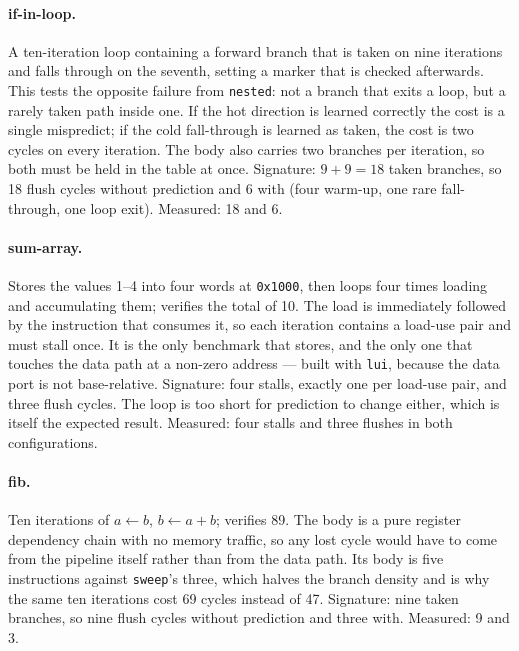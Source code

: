 \documentclass[11pt]{article}
\begin{document}
\paragraph{if-in-loop.} A ten-iteration loop containing a forward branch that is taken on
nine iterations and falls through on the seventh, setting a marker that is checked
afterwards.
This tests the opposite failure from \texttt{nested}: not a branch that exits a loop, but a
rarely taken path inside one. If the hot direction is learned correctly the cost is a
single mispredict; if the cold fall-through is learned as taken, the cost is two cycles on
every iteration. The body also carries two branches per iteration, so both must be held in
the table at once.
Signature: $9+9=18$ taken branches, so 18 flush cycles without prediction and 6 with
(four warm-up, one rare fall-through, one loop exit). Measured: 18 and 6.

\paragraph{sum-array.} Stores the values 1--4 into four words at \texttt{0x1000}, then
loops four times loading and accumulating them; verifies the total of 10.
The load is immediately followed by the instruction that consumes it, so each iteration
contains a load-use pair and must stall once. It is the only benchmark that stores, and the
only one that touches the data path at a non-zero address --- built with \texttt{lui},
because the data port is not base-relative.
Signature: four stalls, exactly one per load-use pair, and three flush cycles. The loop is
too short for prediction to change either, which is itself the expected result. Measured:
four stalls and three flushes in both configurations.

\paragraph{fib.} Ten iterations of $a\leftarrow b$, $b\leftarrow a+b$; verifies 89.
The body is a pure register dependency chain with no memory traffic, so any lost cycle
would have to come from the pipeline itself rather than from the data path. Its body is
five instructions against \texttt{sweep}'s three, which halves the branch density and is
why the same ten iterations cost 69 cycles instead of 47.
Signature: nine taken branches, so nine flush cycles without prediction and three with.
Measured: 9 and 3.
\end{document}
